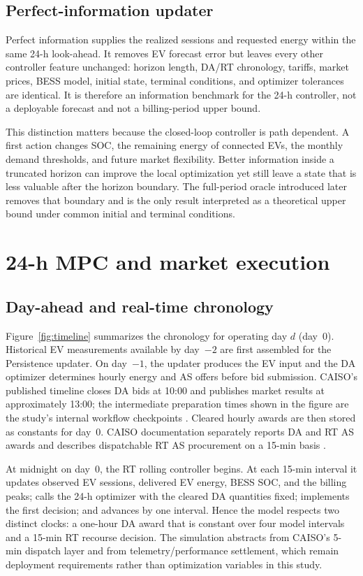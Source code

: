 \documentclass[final,5p,times]{elsarticle}
\begin{document}
\subsection{Perfect-information updater}
Perfect information supplies the realized sessions and requested energy within the same 24-h look-ahead. It removes EV forecast error but leaves every other controller feature unchanged: horizon length, DA/RT chronology, tariffs, market prices, BESS model, initial state, terminal conditions, and optimizer tolerances are identical. It is therefore an information benchmark for the 24-h controller, not a deployable forecast and not a billing-period upper bound.

This distinction matters because the closed-loop controller is path dependent. A first action changes SOC, the remaining energy of connected EVs, the monthly demand thresholds, and future market flexibility. Better information inside a truncated horizon can improve the local optimization yet still leave a state that is less valuable after the horizon boundary. The full-period oracle introduced later removes that boundary and is the only result interpreted as a theoretical upper bound under common initial and terminal conditions.

\section{24-h MPC and market execution}
\label{sec:mpc}

\subsection{Day-ahead and real-time chronology}
Figure~\ref{fig:timeline} summarizes the chronology for operating day $d$ (day~0). Historical EV measurements available by day~$-2$ are first assembled for the Persistence updater. On day~$-1$, the updater produces the EV input and the DA optimizer determines hourly energy and AS offers before bid submission. CAISO's published timeline closes DA bids at 10:00 and publishes market results at approximately 13:00; the intermediate preparation times shown in the figure are the study's internal workflow checkpoints \cite{caisoTimeline2026}. Cleared hourly awards are then stored as constants for day~0. CAISO documentation separately reports DA and RT AS awards and describes dispatchable RT AS procurement on a 15-min basis \cite{caisoMarketOperations2026} \cite{caisoMarketInstruments2026}.

At midnight on day~0, the RT rolling controller begins. At each 15-min interval it updates observed EV sessions, delivered EV energy, BESS SOC, and the billing peaks; calls the 24-h optimizer with the cleared DA quantities fixed; implements the first decision; and advances by one interval. Hence the model respects two distinct clocks: a one-hour DA award that is constant over four model intervals and a 15-min RT recourse decision. The simulation abstracts from CAISO's 5-min dispatch layer and from telemetry/performance settlement, which remain deployment requirements rather than optimization variables in this study.
\end{document}

